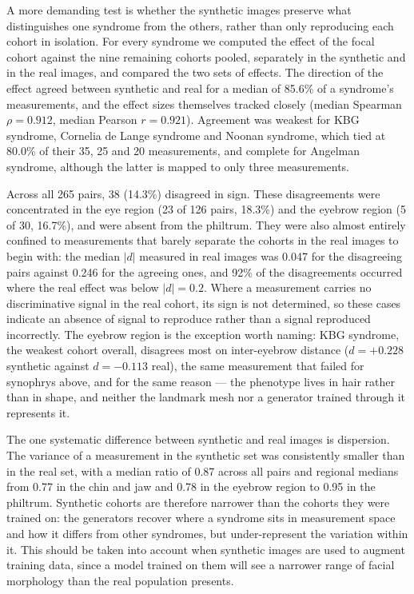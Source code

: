 A more demanding test is whether the synthetic images preserve what
distinguishes one syndrome from the others, rather than only reproducing each
cohort in isolation. For every syndrome we computed the effect of the focal
cohort against the nine remaining cohorts pooled, separately in the synthetic
and in the real images, and compared the two sets of effects. The direction of
the effect agreed between synthetic and real for a median of 85.6\% of a
syndrome's measurements, and the effect sizes themselves tracked closely
(median Spearman $\rho = 0.912$, median Pearson $r = 0.921$). Agreement was
weakest for KBG syndrome, Cornelia de Lange syndrome and Noonan syndrome, which
tied at 80.0\% of their 35, 25 and 20 measurements, and complete for Angelman
syndrome, although the latter is mapped to only three measurements.

Across all 265 pairs, 38 (14.3\%) disagreed in sign. These disagreements were
concentrated in the eye region (23 of 126 pairs, 18.3\%) and the eyebrow region
(5 of 30, 16.7\%), and were absent from the philtrum. They were
also almost entirely confined to measurements that barely separate the cohorts
in the real images to begin with: the median $|d|$ measured in real images was
0.047 for the disagreeing pairs against 0.246 for the agreeing ones, and 92\% of
the disagreements occurred where the real effect was below $|d| = 0.2$. Where a
measurement carries no discriminative signal in the real cohort, its sign is not
determined, so these cases indicate an absence of signal to reproduce rather
than a signal reproduced incorrectly. The eyebrow region is the exception worth
naming: KBG syndrome, the weakest cohort overall, disagrees most on inter-eyebrow
distance ($d = +0.228$ synthetic against $d = -0.113$ real), the same measurement
that failed for synophrys above, and for the same reason --- the phenotype lives
in hair rather than in shape, and neither the landmark mesh nor a generator
trained through it represents it.

The one systematic difference between synthetic and real images is dispersion.
The variance of a measurement in the synthetic set was consistently smaller than
in the real set, with a median ratio of 0.87 across all pairs and regional
medians from 0.77 in the chin and jaw and 0.78 in the eyebrow region to 0.95 in
the philtrum. Synthetic cohorts are therefore narrower than the cohorts they were
trained on: the generators recover where a syndrome sits in measurement space
and how it differs from other syndromes, but under-represent the variation
within it. This should be taken into account when synthetic images are used to
augment training data, since a model trained on them will see a narrower range
of facial morphology than the real population presents.
